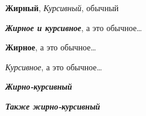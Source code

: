 \documentclass[a4paper, 12pt]{article}
\begin{document}
    \textbf{Жирный}, \textit{Курсивный}, обычный

    {\bfseries \itshape Жирное и курсивное}, а это обычное\dots

    {\bf Жирное}, а это обычное\dots

    {\it Курсивное}, а это обычное\dots

    \textbf{\textit{Жирно-курсивный}}
    
    \textit{\textbf{Также жирно-курсивный}}
\end{document}
